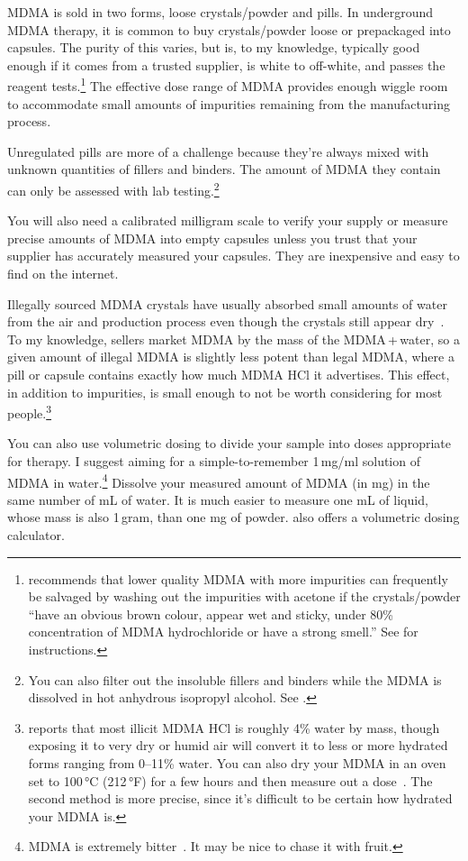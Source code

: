 \documentclass[11pt,oneside]{book}
\let\cite\parencite
\begin{document}
MDMA is sold in two forms, loose crystals/powder and pills. In underground MDMA therapy, it is common to buy crystals/powder loose or prepackaged into capsules. The purity of this varies, but is, to my knowledge, typically good enough if it comes from a trusted supplier, is white to off-white, and passes the reagent tests.\footnote{\textcite{boraxAcetone} recommends that lower quality MDMA with more impurities can frequently be salvaged by washing out the impurities with acetone if the crystals/powder \enquote{have an obvious brown colour, appear wet and sticky, under 80\% concentration of MDMA hydrochloride or have a strong smell.} See \textcite{boraxAcetone} for instructions.} The effective dose range of MDMA provides enough wiggle room to accommodate small amounts of impurities remaining from the manufacturing process.

Unregulated pills are more of a challenge because they're always mixed with unknown quantities of fillers and binders. The amount of MDMA they contain can only be assessed with lab testing.\footnote{You can also filter out the insoluble fillers and binders while the MDMA is dissolved in hot anhydrous isopropyl alcohol. See \textcite{feilongIsopropyl}.}

You will also need a calibrated milligram scale to verify your supply or measure precise amounts of MDMA into empty capsules unless you trust that your supplier has accurately measured your capsules. They are inexpensive and easy to find on the internet.

Illegally sourced MDMA crystals have usually absorbed small amounts of water from the air and production process even though the crystals still appear dry~\cite{kranenburgHydration}. To my knowledge, sellers market MDMA by the mass of the MDMA\,+\,water, so a given amount of illegal MDMA is slightly less potent than legal MDMA, where a pill or capsule contains exactly how much MDMA HCl it advertises. This effect, in addition to impurities, is small enough to not be worth considering for most people.\footnote{\textcite{hydrationPolymorphism} reports that most illicit MDMA HCl is roughly 4\% water by mass, though exposing it to very dry or humid air will convert it to less or more hydrated forms ranging from 0--11\% water. You can also dry your MDMA in an oven set to 100\,°C (212\,°F) for a few hours and then measure out a dose~\cite{kranenburgHydration}. The second method is more precise, since it's difficult to be certain how hydrated your MDMA is.}

You can also use volumetric dosing to divide your sample into doses appropriate for therapy. I suggest aiming for a simple-to-remember 1\,mg/ml solution of MDMA in water.\footnote{MDMA is extremely bitter~\cite{milivcevic2020bitter}. It may be nice to chase it with fruit.} Dissolve your measured amount of MDMA (in mg) in the same number of mL of water. It is much easier to measure one mL of liquid, whose mass is also 1\,gram, than one mg of powder. \textcite{volumetricDilution} also offers a volumetric dosing calculator.
\end{document}

